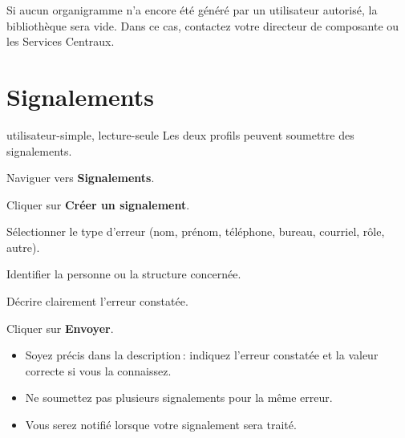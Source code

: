 
\begin{notebox}
  Si aucun organigramme n'a encore \'et\'e g\'en\'er\'e par un utilisateur autoris\'e, la biblioth\`eque sera vide. Dans ce cas, contactez votre directeur de composante ou les Services Centraux.
\end{notebox}

\section{Signalements}

\begin{rolebox}{utilisateur-simple, lecture-seule}
  Les deux profils peuvent soumettre des signalements.
\end{rolebox}

\begin{steps}
  \item Naviguer vers \textbf{Signalements}.
  \item Cliquer sur \textbf{Cr\'eer un signalement}.
  \item S\'electionner le type d'erreur (nom, pr\'enom, t\'el\'ephone, bureau, courriel, r\^ole, autre).
  \item Identifier la personne ou la structure concern\'ee.
  \item D\'ecrire clairement l'erreur constat\'ee.
  \item Cliquer sur \textbf{Envoyer}.
\end{steps}


\begin{tipbox}
  \begin{itemize}
    \item Soyez pr\'ecis dans la description\,: indiquez l'erreur constat\'ee et la valeur correcte si vous la connaissez.
    \item Ne soumettez pas plusieurs signalements pour la m\^eme erreur.
    \item Vous serez notifi\'e lorsque votre signalement sera trait\'e.
  \end{itemize}
\end{tipbox}


